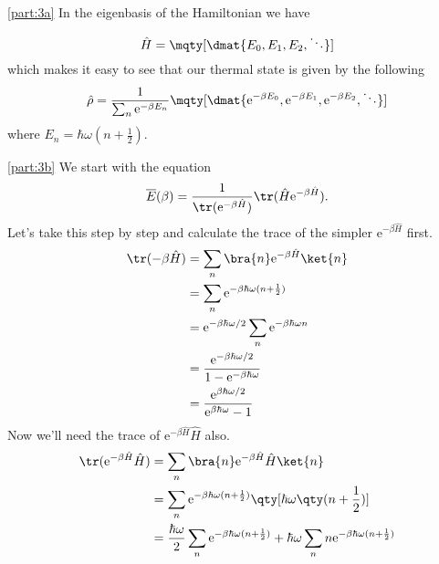 \documentclass[boxes,pages]{homework}
\makeatletter
\newcommand{\e}{\mathrm{e}}
\numberwithin{@problem}{section}
\makeatother
\begin{document}
\begin{solution}
	\ref{part:3a}
	In the eigenbasis of the Hamiltonian we have
	\begin{equation*}
		\hat{H} = \mqty[\dmat{E_0, E_1, E_2, \ddots}]
	\end{equation*}
	which makes it easy to see that our thermal state is given by the following
	\begin{equation*}
		\hat{\rho} = \frac{1}{\sum_n\e^{-\beta E_n}}\mqty[\dmat{\e^{-\beta E_0}, \e^{-\beta E_1}, \e^{-\beta E_2}, \ddots}]
	\end{equation*}
	where $E_n = \hbar\omega(n + \frac{1}{2})$.

	\ref{part:3b}
	We start with the equation
	\begin{equation*}
		\overline{E}(\beta) = \frac{1}{\tr(\e^{-\beta \hat{H}})}\tr(\hat{H}\e^{-\beta\hat{H}}).
	\end{equation*}
	Let's take this step by step and calculate the trace of the simpler $\e^{-\beta \hat{H}}$ first.
	\begin{align*}
		\tr(-\beta\hat{H}) & = \sum_n\bra{n}\e^{-\beta\hat{H}}\ket{n}                      \\
		                   & = \sum_n\e^{-\beta\hbar\omega(n + \frac{1}{2})}               \\
		                   & = \e^{-\beta\hbar\omega/2}\sum_n\e^{-\beta\hbar\omega n}      \\
		                   & = \frac{\e^{-\beta\hbar\omega/2}}{1 - \e^{-\beta\hbar\omega}} \\
		                   & = \frac{\e^{\beta\hbar\omega/2}}{\e^{\beta\hbar\omega} - 1}
	\end{align*}
	Now we'll need the trace of $\e^{-\beta\hat{H}}\hat{H}$ also.
	\begin{align*}
		\tr(\e^{-\beta\hat{H}}\hat{H}) & = \sum_n\bra{n}\e^{-\beta\hat{H}}\hat{H}\ket{n}                                                                                                                                     \\
		                               & = \sum_n \e^{-\beta\hbar\omega(n+\frac{1}{2})}\qty[\hbar\omega\qty(n + \frac{1}{2})]                                                                                                \\
		                               & = \frac{\hbar\omega}{2}\sum_n\e^{-\beta\hbar\omega(n+\frac{1}{2})} + \hbar\omega\sum_n n\e^{-\beta\hbar\omega(n+\frac{1}{2})}                                                       \\

\end{align*}
\end{solution}
\end{document}
